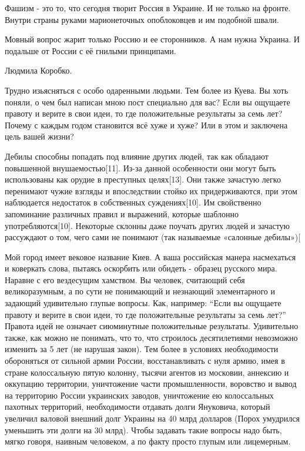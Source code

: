 \begin{itemize}
{\begin{itemize}
Фашизм - это то, что сегодня творит Россия в Украине. И не только на фронте.
Внутри страны руками марионеточных опоблоковцев и им подобной швали.

Мовный вопрос жарит только Россию и ее сторонников. А нам нужна Украина. И
подальше от России с её гнилыми принципами.

Людмила Коробко.

Трудно изьясняться с особо одаренными людьми. Тем более из Куева. Вы хоть
поняли, о чем был написан мною пост специально для вас? Если вы ощущаете
правоту и верите в свои идеи, то где положительные результаты за семь лет?
Почему с каждым годом становится всё хуже и хуже? Или в этом и заключена цель
вашей жизни?

Дебилы способны попадать под влияние других людей, так как обладают повышенной
внушаемостью[11]. Из-за данной особенности они могут быть использованы как
орудие в преступных целях[13]. Они также зачастую легко перенимают чужие
взгляды и впоследствии стойко их придерживаются, при этом наблюдается
недостаток в собственных суждениях[10]. Им свойственно запоминание различных
правил и выражений, которые шаблонно употребляются[10]. Некоторые склонны даже
поучать других людей и зачастую рассуждают о том, чего сами не понимают (так
называемые «салонные дебилы»)[


Мой город имеет вековое название Киев. А ваша российская манера насмехаться и
коверкать слова, пытаясь оскорбить или обидеть - образец русского мира. Наравне
с его вездесущим хамством. Вы человек, считающий себя великоразумным, а по сути
не понимающий и незнающий элементарного и задающий удивительно глупые вопросы.
Как, например: \enquote{Если вы ощущаете правоту и верите в свои идеи, то где
положительные результаты за семь лет?} Правота идей не означает сиюминутные
положительные результаты. Удивительно также, как можно не понимать, что то, что
строилось десятилетиями невозможно изменить за 5 лет (не нарушая закон). Тем
более в условиях необходимости обороняться от сильной армии России,
восстанавливать с нуля армию, имея в стране колоссальную пятую колонну, тысячи
агентов из московии, аннексию и оккупацию территории, уничтожение части
промышленности, воровство и вывод на территорию России украинских заводов,
уничтожение ею колоссальных пахотных территорий, необходимости отдавать долги
Януковича, который увеличил валовой внешний долг Украины на 40 млрд долларов
(Порох умудрился уменьшить эти долги на 30 млрд). Чтобы задавать такие вопросы
надо быть, мягко говоря, наивным человеком, а по факту просто глупым или
лицемерным.


\end{itemize}}
\end{itemize}
